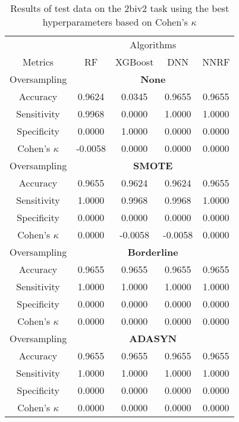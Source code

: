 \begin{table}[!htb]
\centering
\caption{Results of test data on the 2biv2 task using the best hyperparameters based on Cohen's $\kappa$}
\label{tab:2biv2_test_results}
\begin{tabular}{c | c c c c}
\hline
    & \multicolumn{4}{c}{Algorithms}\\ 
Metrics &RF & XGBoost & DNN & NNRF\\ 
\hline
Oversampling &\multicolumn{4}{|c}{\textbf{None}}\\ 
\hline
Accuracy & 0.9624 & 0.0345 & 0.9655 & 0.9655\\ 
Sensitivity & 0.9968 & 0.0000 & 1.0000 & 1.0000\\ 
Specificity & 0.0000 & 1.0000 & 0.0000 & 0.0000\\ 
Cohen's $\kappa$ & -0.0058 & 0.0000 & 0.0000 & 0.0000\\ 
\hline
Oversampling &\multicolumn{4}{|c}{\textbf{SMOTE}}\\ 
\hline
Accuracy & 0.9655 & 0.9624 & 0.9624 & 0.9655\\ 
Sensitivity & 1.0000 & 0.9968 & 0.9968 & 1.0000\\ 
Specificity & 0.0000 & 0.0000 & 0.0000 & 0.0000\\ 
Cohen's $\kappa$ & 0.0000 & -0.0058 & -0.0058 & 0.0000\\ 
\hline
Oversampling &\multicolumn{4}{|c}{\textbf{Borderline}}\\ 
\hline
Accuracy & 0.9655 & 0.9655 & 0.9655 & 0.9655\\ 
Sensitivity & 1.0000 & 1.0000 & 1.0000 & 1.0000\\ 
Specificity & 0.0000 & 0.0000 & 0.0000 & 0.0000\\ 
Cohen's $\kappa$ & 0.0000 & 0.0000 & 0.0000 & 0.0000\\ 
\hline
Oversampling &\multicolumn{4}{|c}{\textbf{ADASYN}}\\ 
\hline
Accuracy & 0.9655 & 0.9655 & 0.9655 & 0.9655\\ 
Sensitivity & 1.0000 & 1.0000 & 1.0000 & 1.0000\\ 
Specificity & 0.0000 & 0.0000 & 0.0000 & 0.0000\\ 
Cohen's $\kappa$ & 0.0000 & 0.0000 & 0.0000 & 0.0000\\ 
\hline
\end{tabular}
\end{table}
